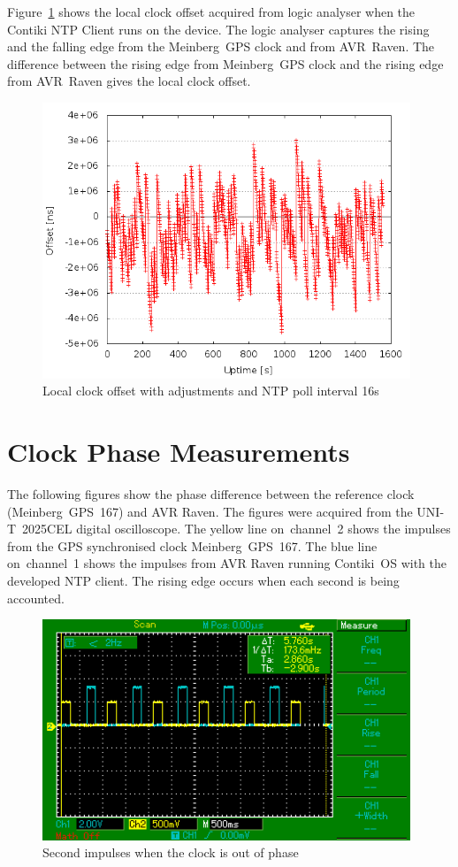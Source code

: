 Figure~\ref{fig:app-ntp-la} shows the local clock offset
acquired from logic analyser when the Contiki NTP Client runs on the device.
The logic analyser captures the rising and the falling edge
from the Meinberg~GPS clock and from AVR~Raven.
The difference between the rising edge from
Meinberg~GPS clock and the rising edge from AVR~Raven gives the local clock offset.
\begin{figure}[H]
  \centering
  \includegraphics[width=11cm,keepaspectratio]{fig/la.png}
  \caption{Local clock offset with adjustments and NTP poll interval 16s}
  \label{fig:app-ntp-la}
\end{figure}


\chapter{Clock Phase Measurements}\label{app:phase}
The following figures show the phase difference between
the reference clock (Meinberg~GPS~167) and AVR Raven.
The figures were acquired from the UNI-T~2025CEL digital oscilloscope.
The yellow line on~channel~2 shows the impulses from the GPS synchronised clock Meinberg~GPS~167.
The blue line on~channel~1 shows the impulses from AVR Raven running
Contiki~OS with the developed NTP client.
The rising edge occurs when each second is being accounted.
\begin{figure}[ht]
  \centering
  \includegraphics[width=11cm,keepaspectratio]{fig/osc-out-of-phase.png}
  \caption{Second impulses when the clock is out of phase}
  \label{fig:app-osc-out-of-phase}
  \bigskip
\end{figure}

